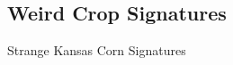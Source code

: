 \documentclass[  compress,xcolor={usenames,dvipsnames}]{beamer}
\begin{document}
\subsection{Weird Crop Signatures}
\begin{frame}{Strange Kansas Corn Signatures}
\begin{figure}
  \centering
  \resizebox{0.7\textwidth}{!}{}
\end{figure}
\end{frame}
\end{document}

